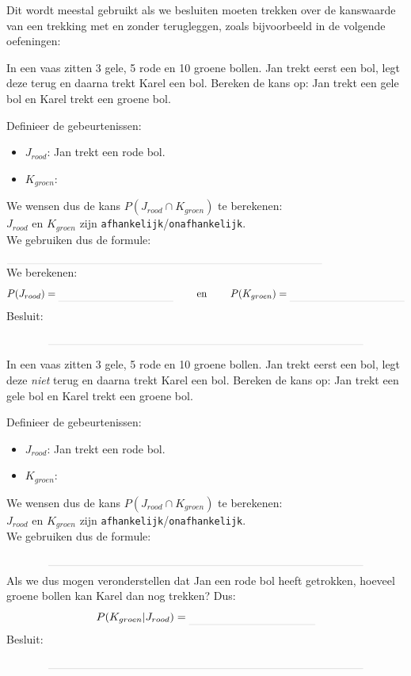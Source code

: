 \documentclass[12pt,twoside]{article}
\begin{document}
Dit wordt meestal gebruikt als we besluiten moeten trekken over de kanswaarde van een trekking met en zonder terugleggen, zoals bijvoorbeeld in de volgende oefeningen:

\begin{oefening}
In een vaas zitten 3 gele, 5 rode en 10 groene bollen. Jan trekt eerst een bol, legt deze terug en daarna trekt Karel een bol. Bereken de kans op: Jan trekt een gele bol en Karel trekt een groene bol.

Definieer de gebeurtenissen:
\begin{itemize}
  \itemsep0.1em
  \item $J_{rood}$: Jan trekt een rode bol.
  \item $K_{groen}$: \arulefill
\end{itemize}
\vspace*{0.5cm}
We wensen dus de kans $P(J_{rood}\cap K_{groen})$ te berekenen:\\
$J_{rood}$ en $K_{groen}$ zijn \verb#afhankelijk#/\verb#onafhankelijk#.\\
We gebruiken dus de formule:
$\arule{10cm}$\\
We berekenen:
$$P(J_{rood})=\arule{4cm} \qquad\mbox{ en }\qquad P(K_{groen})=\arule{4cm}$$
Besluit:
$$\arule{10cm}$$
\end{oefening}

\begin{oefening}
In een vaas zitten 3 gele, 5 rode en 10 groene bollen. Jan trekt eerst een bol, legt deze {\em niet} terug en daarna trekt Karel een bol. Bereken de kans op: Jan trekt een gele bol en Karel trekt een groene bol.

Definieer de gebeurtenissen:
\begin{itemize}
  \itemsep0.1em
  \item $J_{rood}$: Jan trekt een rode bol.
  \item $K_{groen}$: \arulefill
\end{itemize}
\vspace*{0.5cm}
We wensen dus de kans $P(J_{rood}\cap K_{groen})$ te berekenen:\\
$J_{rood}$ en $K_{groen}$ zijn \verb#afhankelijk#/\verb#onafhankelijk#.\\
We gebruiken dus de formule:
$$\arule{10cm}$$
Als we dus mogen veronderstellen dat Jan een rode bol heeft getrokken, hoeveel groene bollen kan Karel dan nog trekken? \arule{2cm}
Dus:
$$P(K_{groen}|J_{rood})=\arule{4cm}$$
Besluit:
$$\arule{10cm}$$
\end{oefening}
\end{document}
